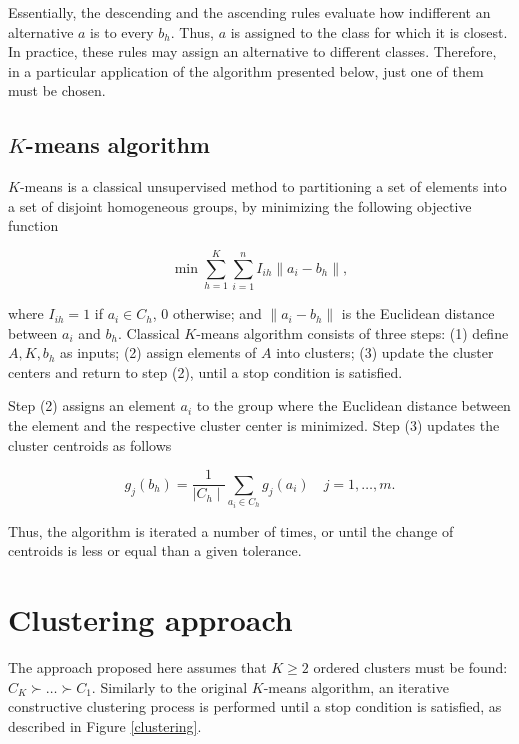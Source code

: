 \documentclass[]{elsarticle}
\theoremstyle{definition}
\begin{document}
Essentially, the descending and the ascending rules evaluate how indifferent an alternative $a$ is to every $b_h$.  Thus, $a$ is assigned to the class for which it is closest.  In practice, these rules may assign an alternative to different classes. Therefore, in a particular application of the algorithm presented below, just one of them must be chosen.


\subsection{$K$-means algorithm}

$K$-means is a classical unsupervised method to partitioning a set of elements into a set of disjoint homogeneous groups, by minimizing the following objective function 

\begin{equation}
\min \sum_{h=1}^{K} \sum_{i=1}^{n} I_{ih} \left\| a_i-b_h \right\|,
\end{equation}


\noindent
where  $I_{ih}=1$ if $a_i \in C_h$, $0$ otherwise; and $ \left\| a_i-b_h \right\|$ is the Euclidean distance between $a_i$ and $b_h$.  Classical $K$-means algorithm consists of three steps: (1) define $A, K, b_h$ as inputs; (2) assign elements of $A$ into clusters; (3) update the cluster centers and return to step (2), until a stop condition is satisfied.   

Step (2) assigns an element $a_i$ to the group where the Euclidean distance between the element and the respective cluster center is minimized.  Step (3) updates the cluster centroids as follows


\begin{equation}
g_j(b_h) = \frac{1}{\mid C_h \mid} \sum_{a_i \in C_h} g_j(a_i) \quad j=1,\ldots,m. \label{newcentroid}
\end{equation}

\noindent
Thus, the algorithm is iterated a number of times, or until the  change of centroids is less or equal than a given tolerance.


\section{Clustering approach}\label{approach}

The approach proposed here assumes that $K\geq 2$ ordered clusters must be found: $C_K \succ \ldots \succ C_1$. Similarly to the original $K$-means algorithm, an iterative constructive clustering process is performed until a stop condition is satisfied, as described  in Figure \ref{clustering}.  
\end{document}
